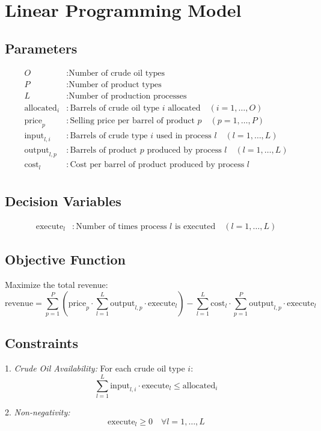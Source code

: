 \documentclass{article}
\begin{document}
\section*{Linear Programming Model}

\subsection*{Parameters}
\begin{align*}
O & : \text{Number of crude oil types} \\
P & : \text{Number of product types} \\
L & : \text{Number of production processes} \\
\text{allocated}_i & : \text{Barrels of crude oil type } i \text{ allocated} \quad (i = 1, \ldots, O) \\
\text{price}_p & : \text{Selling price per barrel of product } p \quad (p = 1, \ldots, P) \\
\text{input}_{l,i} & : \text{Barrels of crude type } i \text{ used in process } l \quad (l = 1, \ldots, L) \\
\text{output}_{l,p} & : \text{Barrels of product } p \text{ produced by process } l \quad (l = 1, \ldots, L) \\
\text{cost}_l & : \text{Cost per barrel of product produced by process } l \\
\end{align*}

\subsection*{Decision Variables}
\begin{align*}
\text{execute}_l & : \text{Number of times process } l \text{ is executed} \quad (l = 1, \ldots, L)
\end{align*}

\subsection*{Objective Function}

Maximize the total revenue:
\[
\text{revenue} = \sum_{p=1}^{P} \left( \text{price}_p \cdot \sum_{l=1}^{L} \text{output}_{l,p} \cdot \text{execute}_l \right) - \sum_{l=1}^{L} \text{cost}_l \cdot \sum_{p=1}^{P} \text{output}_{l,p} \cdot \text{execute}_l
\]

\subsection*{Constraints}

1. \textit{Crude Oil Availability:}
   For each crude oil type \( i \):
   \[
   \sum_{l=1}^{L} \text{input}_{l,i} \cdot \text{execute}_l \leq \text{allocated}_i
   \]

2. \textit{Non-negativity:}
   \[
   \text{execute}_l \geq 0 \quad \forall l = 1, \ldots, L
   \]
\end{document}
